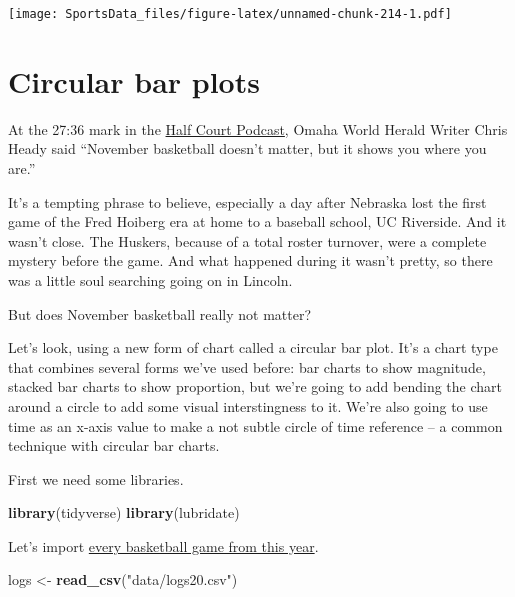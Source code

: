 \documentclass[]{book}
\newenvironment{Shaded}{\begin{snugshade}}{\end{snugshade}}
\newcommand{\KeywordTok}[1]{\textcolor[rgb]{0.13,0.29,0.53}{\textbf{#1}}}
\newcommand{\NormalTok}[1]{#1}
\newcommand{\StringTok}[1]{\textcolor[rgb]{0.31,0.60,0.02}{#1}}
\begin{document}
\texttt{[image: SportsData\_files/figure-latex/unnamed-chunk-214-1.pdf]}

\hypertarget{circular-bar-plots}{%
\chapter{Circular bar plots}\label{circular-bar-plots}}

At the 27:36 mark in the \href{https://www.omaha.com/sports/podcasts/half-court-press/half-court-press-creighton-cruises-in-opener-nebraska-stunned-in/article_67081a35-3a8f-5e9e-ae67-e88fcacbb362.html}{Half Court Podcast}, Omaha World Herald Writer Chris Heady said ``November basketball doesn't matter, but it shows you where you are.''

It's a tempting phrase to believe, especially a day after Nebraska lost the first game of the Fred Hoiberg era at home to a baseball school, UC Riverside. And it wasn't close. The Huskers, because of a total roster turnover, were a complete mystery before the game. And what happened during it wasn't pretty, so there was a little soul searching going on in Lincoln.

But does November basketball really not matter?

Let's look, using a new form of chart called a circular bar plot. It's a chart type that combines several forms we've used before: bar charts to show magnitude, stacked bar charts to show proportion, but we're going to add bending the chart around a circle to add some visual interstingness to it. We're also going to use time as an x-axis value to make a not subtle circle of time reference -- a common technique with circular bar charts.

First we need some libraries.

\begin{Shaded}
\begin{Highlighting}[]
\KeywordTok{library}\NormalTok{(tidyverse)}
\KeywordTok{library}\NormalTok{(lubridate)}
\end{Highlighting}
\end{Shaded}

Let's import \href{https://unl.box.com/s/wnlh0u9low1yh56enion8zjmu8r7dc8p}{every basketball game from this year}.

\begin{Shaded}
\begin{Highlighting}[]
\NormalTok{logs <-}\StringTok{ }\KeywordTok{read_csv}\NormalTok{(}\StringTok{"data/logs20.csv"}\NormalTok{)}
\end{Highlighting}
\end{Shaded}
\end{document}
